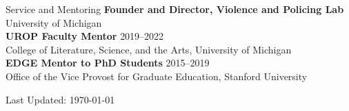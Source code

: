 \documentclass{resume} %
\begin{document}

\begin{rSection}{Service and Mentoring}
{\bf Founder and Director, Violence and Policing Lab} \\
University of Michigan\\

{\bf UROP Faculty Mentor} \hfill {2019--2022}\\
College of Literature, Science, and the Arts, University of Michigan\\

{\bf EDGE Mentor to PhD Students} \hfill {2015--2019}\\
Office of the Vice Provost for Graduate Education, Stanford University\\





\end{rSection}


\small {Last Updated: \monthyeardate\today}
\end{document}
